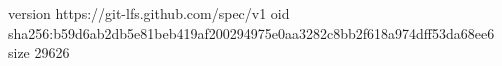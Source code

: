 version https://git-lfs.github.com/spec/v1
oid sha256:b59d6ab2db5e81beb419af200294975e0aa3282c8bb2f618a974dff53da68ee6
size 29626
